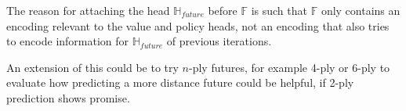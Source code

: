\documentclass[12pt,onecolumn,oneside,titlepage]{article}
\begin{document}
The reason for attaching the head $\mathbb{H}_{future}$ before $\mathbb{F}$ is such that $\mathbb{F}$ only contains an encoding relevant to the value and policy heads, not an encoding that also tries to encode information for $\mathbb{H}_{future}$ of previous iterations.

An extension of this could be to try $n$-ply futures, for example 4-ply or 6-ply to evaluate how predicting a more distance future could be helpful, if 2-ply prediction shows promise.




\pagebreak




\end{document}
